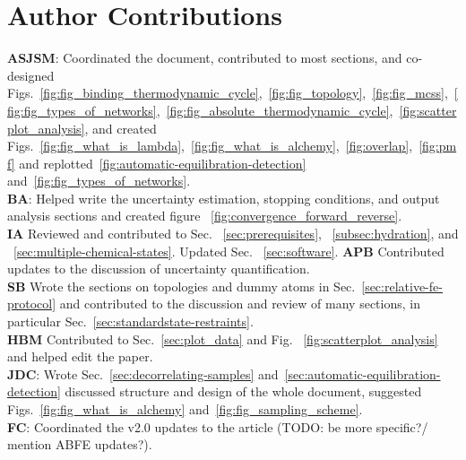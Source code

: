 \documentclass[9pt,bestpractices]{livecoms}
\begin{document}
\section*{Author Contributions}
%
\textbf{ASJSM}: Coordinated the document, contributed to most sections, and co-designed Figs.~\ref{fig:fig_binding_thermodynamic_cycle},~\ref{fig:fig_topology},~\ref{fig:fig_mcss},~\ref{fig:fig_types_of_networks},~\ref{fig:fig_absolute_thermodynamic_cycle},~\ref{fig:scatterplot_analysis}, and created Figs.~\ref{fig:fig_what_is_lambda},~\ref{fig:fig_what_is_alchemy},~\ref{fig:overlap},~\ref{fig:pmf} and replotted~\ref{fig:automatic-equilibration-detection} and~\ref{fig:fig_types_of_networks}.\\
\textbf{BA}: Helped write the uncertainty estimation, stopping conditions, and output analysis sections and created figure ~\ref{fig:convergence_forward_reverse}.\\
\textbf{IA} Reviewed and contributed to Sec. ~\ref{sec:prerequisites}, ~\ref{subsec:hydration}, and ~\ref{sec:multiple-chemical-states}. Updated Sec. ~\ref{sec:software}.
\textbf{APB} Contributed updates to the discussion of uncertainty quantification.\\
\textbf{SB} Wrote the sections on topologies and dummy atoms in Sec.~\ref{sec:relative-fe-protocol} and contributed to the discussion and review of many sections, in particular Sec.~\ref{sec:standardstate-restraints}.\\
\textbf{HBM} Contributed to Sec.~\ref{sec:plot_data} and Fig.~ \ref{fig:scatterplot_analysis} and helped edit the paper.\\
\textbf{JDC}: Wrote Sec.~\ref{sec:decorrelating-samples} and~\ref{sec:automatic-equilibration-detection} discussed structure and design of the whole document, suggested Figs.~\ref{fig:fig_what_is_alchemy} and~\ref{fig:fig_sampling_scheme}. \\
\textbf{FC}: Coordinated the v2.0 updates to the article (TODO: be more specific?/ mention ABFE updates?). \\
\end{document}
